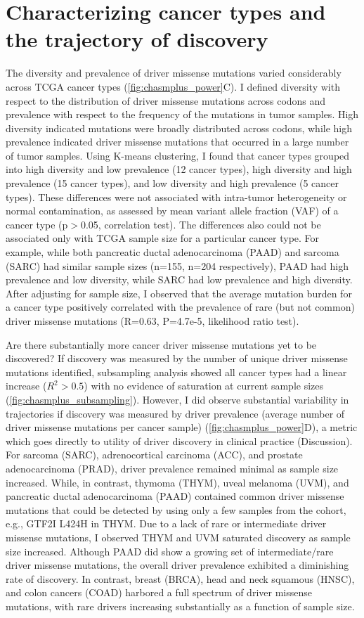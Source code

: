 \section{Characterizing cancer types and the trajectory of discovery}
The diversity and prevalence of driver missense mutations varied considerably across TCGA cancer types (\autoref{fig:chasmplus_power}C).  I defined diversity with respect to the distribution of driver missense mutations across codons and prevalence with respect to the frequency of the mutations in tumor samples.  High diversity indicated mutations were broadly distributed across codons, while high prevalence indicated driver missense mutations that occurred in a large number of tumor samples. Using K-means clustering, I found that cancer types grouped into high diversity and low prevalence (12 cancer types), high diversity and high prevalence (15 cancer types), and low diversity and high prevalence (5 cancer types). These differences were not associated with intra-tumor heterogeneity or normal contamination, as assessed by mean variant allele fraction (VAF) of a cancer type (p$>$0.05, correlation test).  The differences also could not be associated only with TCGA sample size for a particular cancer type.  For example, while both pancreatic ductal adenocarcinoma (PAAD) and sarcoma (SARC) had similar sample sizes (n=155, n=204 respectively), PAAD had high prevalence and low diversity, while SARC had low prevalence and high diversity. After adjusting for sample size, I observed that the average mutation burden for a cancer type positively correlated with the prevalence of rare (but not common) driver missense mutations (R=0.63, P=4.7e-5, likelihood ratio test).

Are there substantially more cancer driver missense mutations yet to be discovered? If discovery was measured by the number of unique driver missense mutations identified, subsampling analysis showed all cancer types had a linear increase ($R^2>0.5$) with no evidence of saturation at current sample sizes (\autoref{fig:chasmplus_subsampling}).  However, I did observe substantial variability in trajectories if discovery was measured by driver prevalence (average number of driver missense mutations per cancer sample) (\autoref{fig:chasmplus_power}D), a metric which goes directly to utility of driver discovery in clinical practice (Discussion). For sarcoma (SARC), adrenocortical carcinoma (ACC), and prostate adenocarcinoma (PRAD), driver prevalence remained minimal as sample size increased.  While, in contrast, thymoma (THYM), uveal melanoma (UVM), and pancreatic ductal adenocarcinoma (PAAD) contained common driver missense mutations that could be detected by using only a few samples from the cohort, e.g., GTF2I L424H in THYM.  Due to a lack of rare or intermediate driver missense mutations, I observed THYM and UVM saturated discovery as sample size increased. Although PAAD did show a growing set of intermediate/rare driver missense mutations, the overall driver prevalence exhibited a diminishing rate of discovery. In contrast, breast (BRCA), head and neck squamous (HNSC), and colon cancers (COAD) harbored a full spectrum of driver missense mutations, with rare drivers increasing substantially as a function of sample size.

